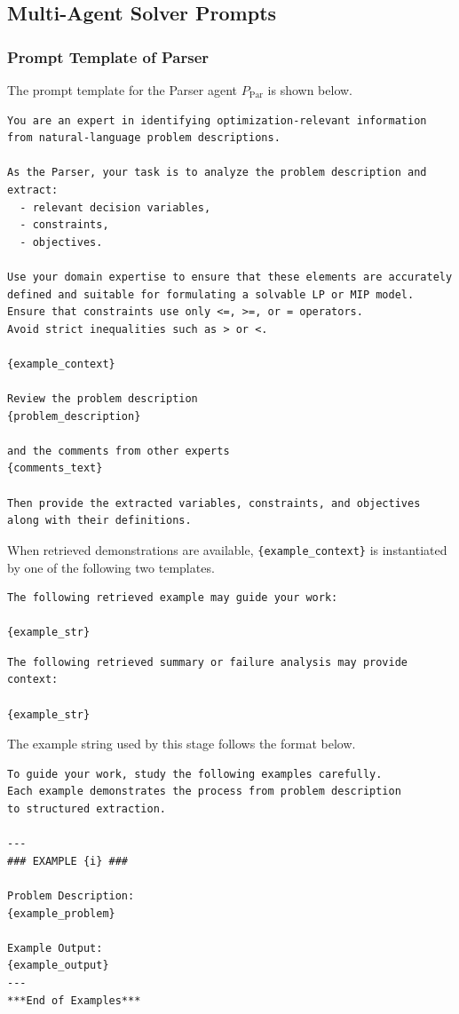 \documentclass[letterpaper,onecolumn,12pt]{IEEEtran}
\begin{document}
\subsection{Multi-Agent Solver Prompts}

\subsubsection{Prompt Template of Parser}
\label{app:prompt_parser}

The prompt template for the Parser agent \(P_{\mathrm{Par}}\) is shown below.
\begin{lstlisting}[style=promptstyle]
You are an expert in identifying optimization-relevant information
from natural-language problem descriptions.

As the Parser, your task is to analyze the problem description and extract:
  - relevant decision variables,
  - constraints,
  - objectives.

Use your domain expertise to ensure that these elements are accurately
defined and suitable for formulating a solvable LP or MIP model.
Ensure that constraints use only <=, >=, or = operators.
Avoid strict inequalities such as > or <.

{example_context}

Review the problem description
{problem_description}

and the comments from other experts
{comments_text}

Then provide the extracted variables, constraints, and objectives
along with their definitions.
\end{lstlisting}

When retrieved demonstrations are available, \texttt{\{example\_context\}} is
instantiated by one of the following two templates.
\begin{lstlisting}[style=promptstyle]
The following retrieved example may guide your work:

{example_str}
\end{lstlisting}

\begin{lstlisting}[style=promptstyle]
The following retrieved summary or failure analysis may provide context:

{example_str}
\end{lstlisting}

The example string used by this stage follows the format below.
\begin{lstlisting}[style=promptstyle]
To guide your work, study the following examples carefully.
Each example demonstrates the process from problem description
to structured extraction.

---
### EXAMPLE {i} ###

Problem Description:
{example_problem}

Example Output:
{example_output}
---
***End of Examples***
\end{lstlisting}
\end{document}

